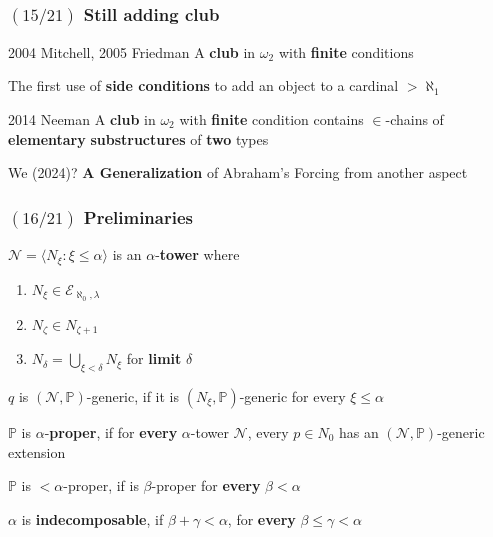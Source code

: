 \documentclass{beamer}
\newcommand{\p}{\mathds{P}}
\newcommand{\el}[1]{\mathcal{E}_{\aleph_0, #1}}
\begin{document}
\begin{frame}
\frametitle{$(15/21)$ \hspace{20mm}Still adding club}
\begin{alertblock}{2004 Mitchell, 2005 Friedman}
A \textbf{club} in $\omega_2$ with \textbf{finite} conditions

The first use of  \textbf{side conditions} to add an object to a cardinal $>\aleph_1$
\end{alertblock}
\pause
\begin{block}{2014 Neeman}
A \textbf{club} in $\omega_2$ with \textbf{finite} condition contains $\in$-chains of \textbf{elementary} \textbf{substructures} of \textbf{two} types
\end{block}
\pause
\begin{alertblock}{We (2024)?}
\textbf{ A Generalization} of Abraham's Forcing from another aspect
\end{alertblock}
\end{frame}
\begin{frame}
\frametitle{$(16/21)$ \hspace{20mm}  Preliminaries}
\begin{alertblock}{}
$\mathcal{N}=\langle N_{\xi}\colon \xi \leq \alpha \rangle$
is an $\alpha$-\textbf{tower} where
\begin{enumerate}
\item
$N_{\xi} \in \el{\lambda}$
\item
$N_{\zeta} \in N_{\zeta +1}$
\item
$\displaystyle N_{\delta}= \bigcup_{\xi < \delta}N_{\xi}$ for \textbf{limit} $\delta$
\end{enumerate}
\pause
\end{alertblock}
\begin{block}{}
$q$ is $(\mathcal{N}, \p)$-generic, if it is $(N_{\xi}, \p)$-generic for every $\xi \leq \alpha$
\end{block}
\pause
\begin{alertblock}{}
$\p$ is $\alpha$-\textbf{proper}, if for \textbf{every} $\alpha$-tower $\mathcal{N}$, every $p \in N_0$ has an $(\mathcal{N}, \p)$-generic extension

$\p$ is $<\alpha$-proper, if is $\beta$-proper for \textbf{every} $\beta<\alpha$
\end{alertblock}
\pause
\begin{block}{}
$\alpha$ is \textbf{indecomposable}, if $\beta + \gamma < \alpha$, for \textbf{every} $\beta \leq \gamma < \alpha$
\end{block}
\end{frame}
\end{document}
